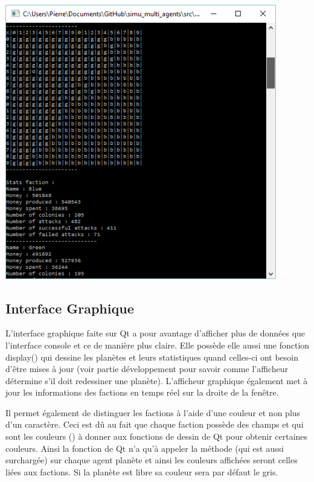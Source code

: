   \begin{center}
    \includegraphics[height=12cm]{images/console.png}
  \end{center}


  \subsection{Interface Graphique}
  L’interface graphique faite sur Qt a pour avantage d’afficher plus de données que l’interface console et ce de manière plus claire. Elle possède elle aussi une fonction display() qui dessine les planètes et leurs statistiques quand celles-ci ont besoin d'être mises à jour (voir partie développement pour savoir comme l’afficheur détermine s’il doit redessiner une planète). L’afficheur graphique également met à jour les informations des factions en temps réel sur la droite de la fenêtre.
  
  Il permet également de distinguer les factions à l’aide d’une couleur et non plus d’un caractère. Ceci est dû au fait que chaque faction possède des champs  et  qui sont les couleurs () à donner aux fonctions de dessin de Qt pour obtenir certaines couleurs. Ainsi la fonction de Qt n’a qu’à appeler la méthode  (qui est aussi surchargée) sur chaque agent planète et ainsi les couleurs affichées seront celles liées aux factions. Si la planète est libre sa couleur sera par défaut le gris.
  
